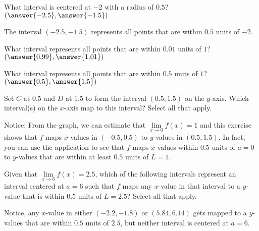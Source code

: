 \documentclass{ximera}
\begin{document}
\begin{exercise}
    \begin{question}
    	What interval is centered at $-2$ with a radius of $ 0.5$? $\left( \answer{-2.5}, \answer{-1.5}\right)$
    	\begin{feedback}
    		The interval $(-2.5, -1.5)$ represents all points that are within $0.5$ units of $-2$.
    	\end{feedback}
    \end{question}
    \begin{question}
    	What interval represents all points that are within $0.01$ units of $1$?  $\left( \answer{0.99}, \answer{1.01} \right)$
    \end{question}
 	\begin{question}
 		What interval represents all points that are within $0.5$ units of $1$?  $\left( \answer{0.5}, \answer{1.5}\right)$
		\begin{question}
 			Set $C$ at $0.5$ and $D$ at $1.5$ to form the interval $(0.5, 1.5)$ on the $y$-axis.  Which interval(s) on the $x$-axis map to this interval? Select all that apply.
 			\begin{selectAll}
 			\end{selectAll}
 		    \begin{feedback}
 		    	Notice: From the graph, we can estimate that $\lim\limits_{x \to 0}f(x)=1$ and this exercise shows that $f$ maps $x$-values in $(-0.5, 0.5)$ to $y$-values in $(0.5, 1.5)$.  In fact, you can use the application to see that $f$ maps $x$-values within $0.5$ units of $a=0$ to $y$-values that are within at least $0.5$ units of $L=1$.
 		    \end{feedback}
  		\end{question}	
 	\end{question}
 	\begin{question}
 		Given that $\lim\limits_{x \to 6}f(x)=2.5$, which of the following intervals represent an interval centered at $a=6$ such that $f$ maps any $x$-value in that interval to a $y$-value that is within $0.5$ units of $L=2.5$?  Select all that apply.
 		\begin{selectAll}
 			\choice{$(-2.2, -1.8)$}
 			\choice[correct]{$(5.9, 6.1)$}
 			\choice{$(5.84, 6.14)$}
 			\choice[correct]{$(5.95, 6.05)$}
 		\end{selectAll}
 		\begin{feedback}
 			Notice, any $x$-value in either $(-2.2, -1.8)$ or $ (5.84, 6.14) $ gets mapped to a $y$-values that are within $0.5$ units of $2.5$, but neither interval is centered at $a=6$.
 			

\end{feedback}
\end{question}
\end{exercise}
\end{document}
